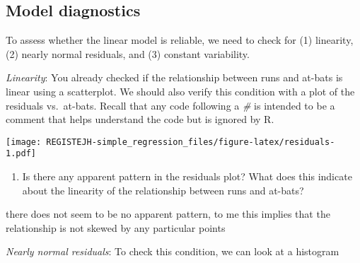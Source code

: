 \documentclass[
]{article}
\newenvironment{Shaded}{\begin{snugshade}}{\end{snugshade}}
\newcommand{\CommentTok}[1]{\textcolor[rgb]{0.56,0.35,0.01}{\textit{#1}}}
\newcommand{\DataTypeTok}[1]{\textcolor[rgb]{0.13,0.29,0.53}{#1}}
\newcommand{\DecValTok}[1]{\textcolor[rgb]{0.00,0.00,0.81}{#1}}
\newcommand{\KeywordTok}[1]{\textcolor[rgb]{0.13,0.29,0.53}{\textbf{#1}}}
\newcommand{\NormalTok}[1]{#1}
\newcommand{\OperatorTok}[1]{\textcolor[rgb]{0.81,0.36,0.00}{\textbf{#1}}}
\newcommand{\StringTok}[1]{\textcolor[rgb]{0.31,0.60,0.02}{#1}}
\providecommand{\tightlist}{%
  \setlength{\itemsep}{0pt}\setlength{\parskip}{0pt}}
\begin{document}
\hypertarget{model-diagnostics}{%
\subsection{Model diagnostics}\label{model-diagnostics}}

To assess whether the linear model is reliable, we need to check for (1)
linearity, (2) nearly normal residuals, and (3) constant variability.

\emph{Linearity}: You already checked if the relationship between runs
and at-bats is linear using a scatterplot. We should also verify this
condition with a plot of the residuals vs.~at-bats. Recall that any code
following a \emph{\#} is intended to be a comment that helps understand
the code but is ignored by R.

\begin{Shaded}
\end{Shaded}

\texttt{[image: REGISTEJH-simple\_regression\_files/figure-latex/residuals-1.pdf]}

\begin{enumerate}
\def\labelenumi{\arabic{enumi}.}
\setcounter{enumi}{5}
\tightlist
\item
  Is there any apparent pattern in the residuals plot? What does this
  indicate about the linearity of the relationship between runs and
  at-bats?
\end{enumerate}

there does not seem to be no apparent pattern, to me this implies that
the relationship is not skewed by any particular points

\emph{Nearly normal residuals}: To check this condition, we can look at
a histogram

\begin{Shaded}
\end{Shaded}
\end{document}
